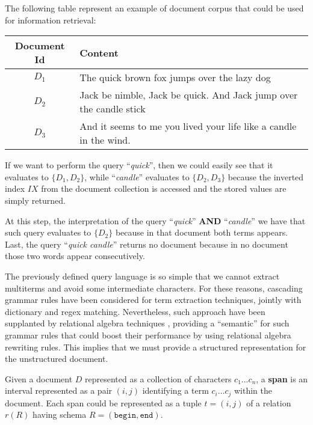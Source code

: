 \begin{example}
The following table represent an example of document corpus that could be used for information retrieval:

\begin{tabular}{c|l}
\toprule
	Document Id & Content \\
\midrule
	$D_1$ & The quick brown fox jumps over the lazy dog \\
	$D_2$ & Jack be nimble, Jack be quick. And Jack jump over the candle stick \\
	$D_3$ & And it seems to me you lived your life like a candle in the wind.\\
\bottomrule
\end{tabular}
	
If we want to perform the query ``\textit{quick}'', then we could easily see that it evaluates to $\{D_1,D_2\}$, while ``\textit{candle}'' evaluates to $\{D_2,D_3\}$ because the inverted index $IX$ from the document collection is accessed and the stored values are simply returned. 

At this step, the interpretation of the query ``\textit{quick}''\textbf{ AND }``\textit{candle}'' we have that such query evaluates to $\{D_2\}$ because in that document both terms appears. Last, the query ``\textit{quick candle}'' returns no document because in no document those two words appear consecutively.
\end{example}


The previously defined query language is so simple that we cannot extract multiterms and avoid some intermediate characters. For these reasons, cascading grammar rules have been considered for term extraction techniques, jointly with dictionary and regex matching. Nevertheless, such approach have been supplanted by relational algebra techniques \cite{IBMReiss}, providing a ``semantic'' for such grammar rules that could boost their performance by using relational algebra rewriting rules. This implies that we must provide a structured representation for the unstructured document. 

\begin{definition}[Span]
Given a document $D$ represented as a collection of characters $c_1\dots c_n$, a \textbf{span} \cite{IBMReiss} is an interval represented as a pair $(i,j)$ identifying a term $c_i\dots c_j$ within the document. Each span could be represented as a tuple $t=(i,j)$ of a relation $r(R)$ having schema $R=(\texttt{begin},\texttt{end})$.
\end{definition}

